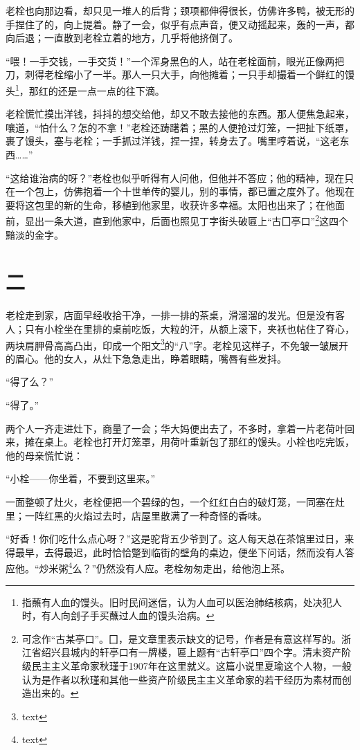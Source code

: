 \documentclass[12pt,UTF8]{ctexbook}
\begin{document}
老栓也向那边看，却只见一堆人的后背；颈项都伸得很长，仿佛许多鸭，被无形的手捏住了的，向上提着。静了一会，似乎有点声音，便又动摇起来，轰的一声，都向后退；一直散到老栓立着的地方，几乎将他挤倒了。

“喂！一手交钱，一手交货！”一个浑身黑色的人，站在老栓面前，眼光正像两把刀，刺得老栓缩小了一半。那人一只大手，向他摊着；一只手却撮着一个鲜红的馒头\footnote{指蘸有人血的馒头。旧时民间迷信，认为人血可以医治肺结核病，处决犯人时，有人向刽子手买蘸过人血的馒头治病。}，那红的还是一点一点的往下滴。

老栓慌忙摸出洋钱，抖抖的想交给他，却又不敢去接他的东西。那人便焦急起来，嚷道，“怕什么？怎的不拿！”老栓还踌躇着；黑的人便抢过灯笼，一把扯下纸罩，裹了馒头，塞与老栓；一手抓过洋钱，捏一捏，转身去了。嘴里哼着说，“这老东西……”

“这给谁治病的呀？”老栓也似乎听得有人问他，但他并不答应；他的精神，现在只在一个包上，仿佛抱着一个十世单传的婴儿，别的事情，都已置之度外了。他现在要将这包里的新的生命，移植到他家里，收获许多幸福。太阳也出来了；在他面前，显出一条大道，直到他家中，后面也照见丁字街头破匾上“古囗亭口”\footnote{可念作“古某亭口”。囗，是文章里表示缺文的记号，作者是有意这样写的。浙江省绍兴县城内的轩亭口有一牌楼，匾上题有“古轩亭口”四个字。清末资产阶级民主主义革命家秋瑾于1907年在这里就义。这篇小说里夏瑜这个人物，一般认为是作者以秋瑾和其他一些资产阶级民主主义革命家的若干经历为素材而创造出来的。}这四个黯淡的金字。

\chapter{二}

老栓走到家，店面早经收拾干净，一排一排的茶桌，滑溜溜的发光。但是没有客人；只有小栓坐在里排的桌前吃饭，大粒的汗，从额上滚下，夹袄也帖住了脊心，两块肩胛骨高高凸出，印成一个阳文\footnote{text}的“八”字。老栓见这样子，不免皱一皱展开的眉心。他的女人，从灶下急急走出，睁着眼睛，嘴唇有些发抖。

“得了么？”

“得了。”

两个人一齐走进灶下，商量了一会；华大妈便出去了，不多时，拿着一片老荷叶回来，摊在桌上。老栓也打开灯笼罩，用荷叶重新包了那红的馒头。小栓也吃完饭，他的母亲慌忙说：

“小栓——你坐着，不要到这里来。”

一面整顿了灶火，老栓便把一个碧绿的包，一个红红白白的破灯笼，一同塞在灶里；一阵红黑的火焰过去时，店屋里散满了一种奇怪的香味。

“好香！你们吃什么点心呀？”这是驼背五少爷到了。这人每天总在茶馆里过日，来得最早，去得最迟，此时恰恰蹩到临街的壁角的桌边，便坐下问话，然而没有人答应他。“炒米粥\footnote{text}么？”仍然没有人应。老栓匆匆走出，给他泡上茶。
\end{document}
